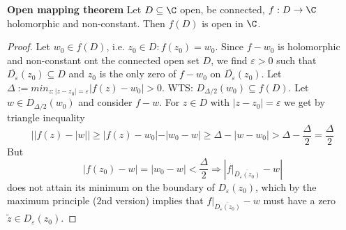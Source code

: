 \begin{theorem}
  \textbf{Open mapping theorem}
  \newline Let $D\subseteq \C$ open, be connected, $f:D\to \C$ holomorphic and non-constant. Then $f(D)$ is open in $\C$.
\end{theorem}
\begin{proof}
  Let $w_0 \in f(D)$, i.e. $z_0 \in D: f(z_0)=w_0$. Since $f-w_0$ is holomorphic and non-constant ont the connected open set $D$, we find $\varepsilon >0$ such that $\overline{D_{\varepsilon}}(z_0)\subseteq D$ and $z_0$ is the only zero of $f-w_0$ on $\overline{D_{\varepsilon}}(z_0)$. Let $\Delta:=min_{z:|z-z_0|=\varepsilon}|f(z)-w_0| >0$.
  WTS: $D_{\Delta/2}(w_0)\subseteq f(D)$. Let $w\in D_{\Delta/2}(w_0)$ and consider $f-w$. For $z\in D$ with $|z-z_0|=\varepsilon$ we get by triangle inequality
    $$||f(z)-|w|| \geq |f(z)-w_0|-|w_0-w|\geq \Delta -|w-w_0|>\Delta - \frac{\Delta}{2}=\frac{\Delta}{2}$$
    But $$|f(z_0)-w|=|w_0-w|<\frac{\Delta}{2}\Rightarrow \left|f\rvert_{\overline{D_{\varepsilon}(z_0)}}-w\right|$$
    does not attain its minimum on the boundary of $D_{\varepsilon}(z_0)$, which by the maximum principle ($2$nd version) implies that $f\rvert_{\overline{D_{\varepsilon}(z_0)}}-w$ must have a zero $\tilde{z}\in D_{\varepsilon}(z_0)$.
    \qedhere
\end{proof}
